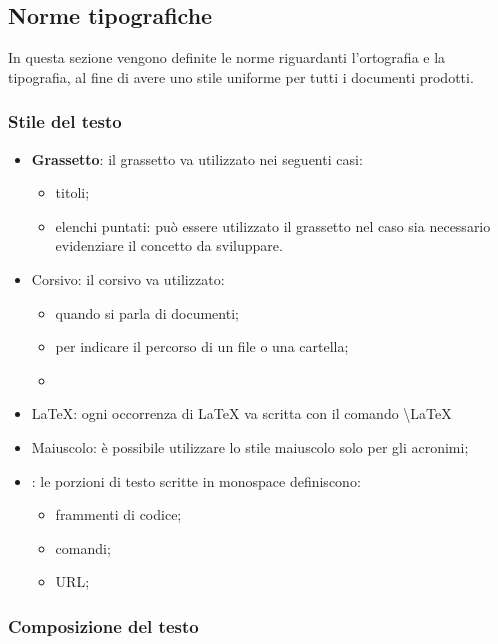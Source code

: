 	
	\subsection{Norme tipografiche}
	In questa sezione vengono definite le norme riguardanti l'ortografia e la tipografia, al fine di avere uno stile uniforme per tutti i documenti prodotti.
		\subsubsection{Stile del testo}
		\begin{itemize}
			\item \textbf{Grassetto}: il grassetto va utilizzato nei seguenti casi:
			\begin{itemize}
				\item titoli;
				\item elenchi puntati: può essere utilizzato il grassetto nel caso sia necessario evidenziare il concetto da sviluppare.
			\end{itemize}
			\item Corsivo: il corsivo va utilizzato:
			\begin{itemize}
				\item quando si parla di documenti;
				\item per indicare il percorso di un file o una cartella;
				\item 
			\end{itemize}
			\item \LaTeX: ogni occorrenza di \LaTeX{} va scritta con il comando \textbackslash LaTeX
			\item Maiuscolo: è possibile utilizzare lo stile maiuscolo solo per gli acronimi;
			\item {}: le porzioni di testo scritte in monospace definiscono:
			\begin{itemize}
				\item frammenti di codice;
				\item comandi;
				\item URL;
			\end{itemize} 
		\end{itemize}
		\subsubsection{Composizione del testo}
